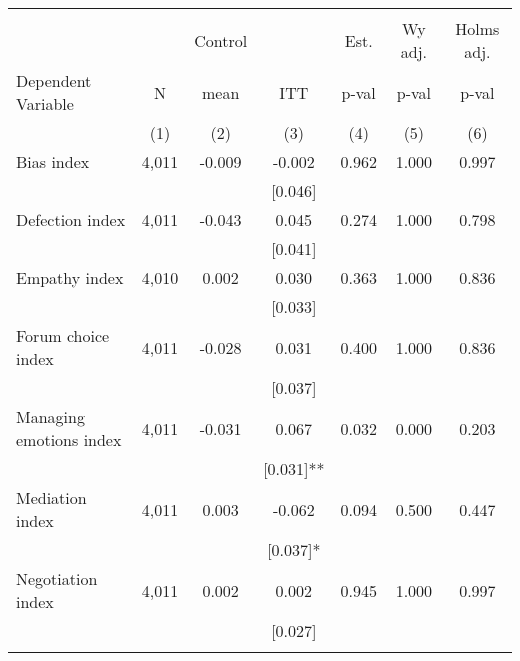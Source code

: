 \begin{tabular}{lcccccc}
\hline \noalign{\smallskip} &  &  &  &  &  & \\
 &  & Control &  & Est. & Wy adj. & Holms adj.\\
Dependent Variable & N & mean & ITT & p-val & p-val & p-val\\
 & (1) & (2) & (3) & (4) & (5) & (6)\\
\noalign{\smallskip}\hline \noalign{\smallskip}Bias index & 4,011 & -0.009 & -0.002 & 0.962 & 1.000 & 0.997\\
 &  &  & [0.046] &  &  & \\
Defection index & 4,011 & -0.043 & 0.045 & 0.274 & 1.000 & 0.798\\
 &  &  & [0.041] &  &  & \\
Empathy index & 4,010 & 0.002 & 0.030 & 0.363 & 1.000 & 0.836\\
 &  &  & [0.033] &  &  & \\
Forum choice index & 4,011 & -0.028 & 0.031 & 0.400 & 1.000 & 0.836\\
 &  &  & [0.037] &  &  & \\
Managing emotions index & 4,011 & -0.031 & 0.067 & 0.032 & 0.000 & 0.203\\
 &  &  & [0.031]** &  &  & \\
Mediation index & 4,011 & 0.003 & -0.062 & 0.094 & 0.500 & 0.447\\
 &  &  & [0.037]* &  &  & \\
Negotiation index & 4,011 & 0.002 & 0.002 & 0.945 & 1.000 & 0.997\\
 &  &  & [0.027] &  &  & \\
\noalign{\smallskip}\hline\end{tabular}
